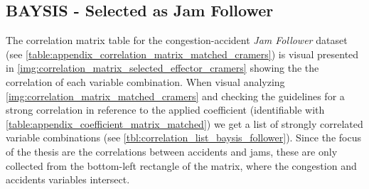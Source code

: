 \subsection{BAYSIS - Selected as Jam Follower}
\label{analysis_processing_correlation_baysis_follower}
The correlation matrix table for the congestion-accident \textit{Jam Follower} dataset (see \cref{table:appendix_correlation_matrix_matched_cramers}) is visual presented in \cref{img:correlation_matrix_selected_effector_cramers} showing the the correlation of each variable combination. When visual analyzing \cref{img:correlation_matrix_matched_cramers} and checking the guidelines for a strong correlation in reference to the applied coefficient (identifiable with \cref{table:appendix_coefficient_matrix_matched}) we get a list of strongly correlated variable combinations (see \cref{tbl:correlation_list_baysis_follower}). Since the focus of the thesis are the correlations between accidents and jams, these are only collected from the bottom-left rectangle of the matrix, where the congestion and accidents variables intersect.

